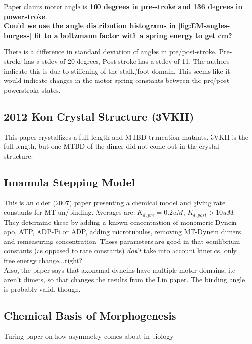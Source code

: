 \documentclass[10pt]{article} %
\begin{document}
Paper claims motor angle is \textbf{160 degrees in pre-stroke and 136 degrees in powerstroke}.\\

\textbf{Could we use the angle distribution histograms in \ref{fig:EM-angles-burgess} fit to a boltzmann factor with a spring energy to get cm?}



There is a difference in standard deviation of angles in pre/post-stroke. Pre-stroke has a stdev of 20 degrees, Post-stroke has a stdev of 11. The authors indicate this is due to stiffening of the stalk/foot domain. This seems like it would indicate changes in the motor spring constants between the pre/post-powerstroke states.

\subsection{2012 Kon Crystal Structure (3VKH)}
This paper crystallizes a full-length and MTBD-truncation mutants. 3VKH is the full-length, but one MTBD of the dimer did not come out in the crystal structure.

\subsection{Imamula Stepping Model}
This is an older (2007) paper presenting a chemical model and giving rate constants for MT un/binding. Averages are: $K_{d,pre} = 0.2uM$, $K_{d,post} > 10uM$. They determine these by adding a known concentration of monomeric Dynein apo, ATP, ADP-Pi or ADP, adding microtubules, removing MT-Dynein dimers and remeasuring concentration. These parameters are good in that equilibrium constants (as opposed to rate constants) \textit{don't} take into account kinetics, only free energy change...right?\\

Also, the paper says that axonemal dyneins have multiple motor domains, i.e aren't dimers, so that changes the results from the Lin paper. The binding angle is probably valid, though.\\

\subsection{Chemical Basis of Morphogenesis}
Turing paper on how asymmetry comes about in biology\\
\end{document}
